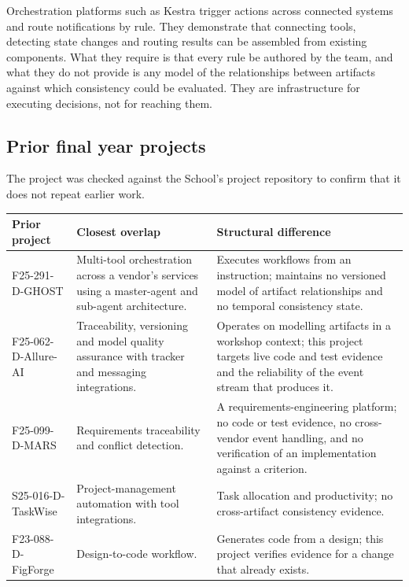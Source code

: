 Orchestration platforms such as Kestra trigger actions across connected systems
and route notifications by rule. They demonstrate that connecting tools,
detecting state changes and routing results can be assembled from existing
components. What they require is that every rule be authored by the team, and
what they do not provide is any model of the relationships between artifacts
against which consistency could be evaluated. They are infrastructure for
executing decisions, not for reaching them.

\subsection{Prior final year projects}

The project was checked against the School's project repository to confirm that
it does not repeat earlier work.

\begin{longtable}{>{\raggedright\arraybackslash}p{}>{\raggedright\arraybackslash}p{}>{\raggedright\arraybackslash}p{}}
\toprule
Prior project & Closest overlap & Structural difference \\
\midrule
\endhead
F25-291-D-GHOST
  & Multi-tool orchestration across a vendor's services using a master-agent
    and sub-agent architecture.
  & Executes workflows from an instruction; maintains no versioned model of
    artifact relationships and no temporal consistency state. \\
F25-062-D-Allure-AI
  & Traceability, versioning and model quality assurance with tracker and
    messaging integrations.
  & Operates on modelling artifacts in a workshop context; this project targets
    live code and test evidence and the reliability of the event stream that
    produces it. \\
F25-099-D-MARS
  & Requirements traceability and conflict detection.
  & A requirements-engineering platform; no code or test evidence, no
    cross-vendor event handling, and no verification of an implementation
    against a criterion. \\
S25-016-D-TaskWise
  & Project-management automation with tool integrations.
  & Task allocation and productivity; no cross-artifact consistency evidence. \\
F23-088-D-FigForge
  & Design-to-code workflow.
  & Generates code from a design; this project verifies evidence for a change
    that already exists. \\
\bottomrule
\end{longtable}

